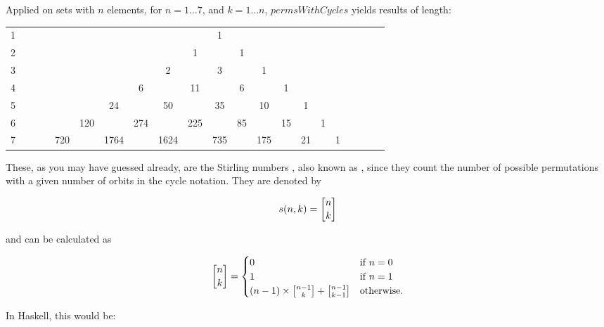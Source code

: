\documentclass{scrreprt}
\newcommand{\Varid}[1]{\mathit{#1}}
\begin{document}
Applied on sets with $n$ elements, for $n = 1 \dots  7$,
and $k = 1 \dots n$, \ensuremath{\Varid{permsWithCycles}} yields results of length:

\begin{tabular}{l c c c c c c c c c c c c c c c c c c c c}
1 &   &   &   &   &    &    &    &     &     &   1 &     &     &    &    &    &   &   &   &   &  \\
2 &   &   &   &   &    &    &    &     &   1 &     &   1 &     &    &    &    &   &   &   &   &  \\
3 &   &   &   &   &    &    &    &   2 &     &   3 &     &   1 &    &    &    &   &   &   &   &  \\
4 &   &   &   &   &    &    &  6 &     &  11 &     &   6 &     &  1 &    &    &   &   &   &   &  \\
5 &   &   &   &   &    & 24 &    &  50 &     &  35 &     &  10 &    &  1 &    &   &   &   &   &  \\
6 &   &   &   &   & 120&    &274 &     & 225 &     &  85 &     & 15 &    &  1 &   &   &   &   &  \\   
7 &   &   &   &720&    &1764&    &1624 &     & 735 &     & 175 &    & 21 &    & 1 &   &   &   &  
\end{tabular}

These, as you may have guessed already,
are the Stirling numbers ,
also known as ,
since they count the number of possible permutations
with a given number of orbits in the cycle notation.
They are denoted by

\begin{equation}
  s(n,k) = \stirlingOne{n}{k}
\end{equation}

and can be calculated as

\begin{equation}
\stirlingOne{n}{k} = \begin{cases}
                       0 & \textrm{if $n = 0$}\\
                       1 & \textrm{if $n = 1$}\\
                       (n-1) \times \stirlingOne{n-1}{k} + 
                                    \stirlingOne{n-1}{k-1} &
                         \textrm{otherwise}.
                   \end{cases}
\end{equation}

In Haskell, this would be:
\end{document}
